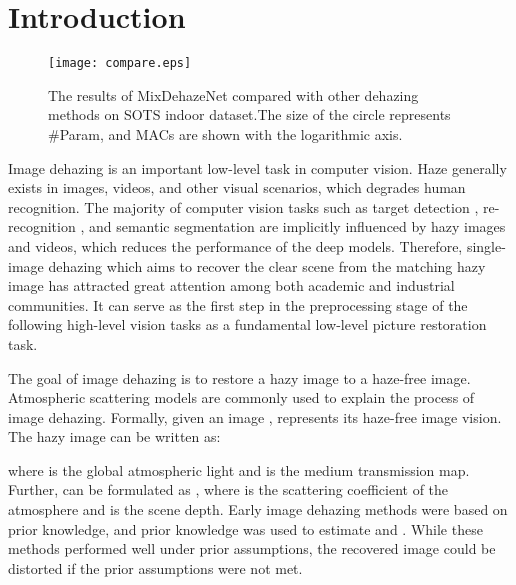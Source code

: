 \documentclass[10pt,twocolumn,letterpaper]{article}
\begin{document}
\section{Introduction}

\begin{figure}[t]
\begin{center}
\texttt{[image: compare.eps]}
\end{center}
   \caption{The results of MixDehazeNet compared with other dehazing methods on SOTS indoor dataset.The size of the circle represents \#Param, and MACs are shown with the logarithmic axis.}
   \label{Figure 1}
\label{fig:long}
\label{fig:onecol}
\end{figure}

Image dehazing is an important low-level task in computer vision. Haze generally exists in images, videos, and other visual scenarios, which degrades human recognition. The majority of computer vision tasks such as target detection \cite{yolov3,maskRcnn,NAS-FPN}, re-recognition \cite{LifelongPersonRe-identification,GeneralizablePersonRe-identification}, and semantic segmentation \cite{FCNSegmentation,DeeplabSegmentation,PyramidSegmentation} are implicitly influenced by hazy images and videos, which reduces the performance of the deep models. Therefore, single-image dehazing which aims to recover the clear scene from the matching hazy image has attracted great attention among both academic and industrial communities. It can serve as the first step in the preprocessing stage of the following high-level vision tasks as a fundamental low-level picture restoration task.





The goal of image dehazing is to restore a hazy image to a haze-free image. Atmospheric scattering models \cite{mccartney1976optics,narasimhan2002vision,nayar1999vision} are commonly used to explain the process of image dehazing. Formally, given an image ,  represents its haze-free image vision. The hazy image can be written as:

where  is the global atmospheric light and  is the medium transmission map. Further,  can be formulated as , where  is the scattering coefficient of the atmosphere and  is the scene depth. 
Early image dehazing methods \cite{berman2016non,fattal2014dehazing,he2010single,zhu2015fast} were based on prior knowledge, and prior knowledge was used to estimate  and . While these methods performed well under prior assumptions, the recovered image could be distorted if the prior assumptions were not met.
\end{document}

